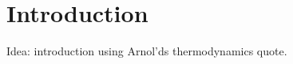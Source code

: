 \chapter{Introduction}
\label{chap:intro}


Idea: introduction using Arnol'ds thermodynamics quote.

%

